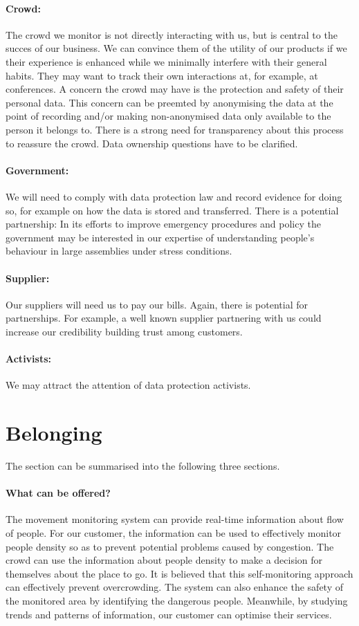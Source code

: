 \documentclass[12pt, oneside]{article}
\begin{document}
\paragraph{Crowd:} The crowd we monitor is not directly interacting with us, but is central to the succes of our business. We can convince them of the utility of our products if we their experience is enhanced while we minimally interfere with their general habits. They may want to track their own interactions at, for example, at conferences. A concern the crowd may have is the protection and safety of their personal data. This concern can be preemted by anonymising the data at the point of recording and/or making non-anonymised data only available to the person it belongs to. There is a strong need for transparency about this process to reassure the crowd. Data ownership questions have to be clarified.

\paragraph{Government:} We will need to comply with data protection law and record evidence for doing so, for example on how the data is stored and transferred. There is a potential partnership: In its efforts to improve emergency procedures and policy the government may be interested in our expertise of understanding people's behaviour in large assemblies under stress conditions.

\paragraph{Supplier:} Our suppliers will need us to pay our bills. Again, there is potential for partnerships. For example, a well known supplier partnering with us could increase our credibility building trust among customers. 

\paragraph{Activists:} We may attract the attention of data protection activists.

\section{Belonging} 
The section can be summarised into the following three sections. 
 
\paragraph{What can be offered?} The movement monitoring system can provide real-time information about flow of people. For our customer, the information can be used to effectively monitor people density so as to prevent potential problems caused by congestion. The crowd can use the information about people density to make a decision for themselves about the place to go. It is believed that this self-monitoring approach can effectively prevent overcrowding. The system can also enhance the safety of the monitored area by identifying the dangerous people. Meanwhile, by studying trends and patterns of information, our customer can optimise their services.
\end{document}
